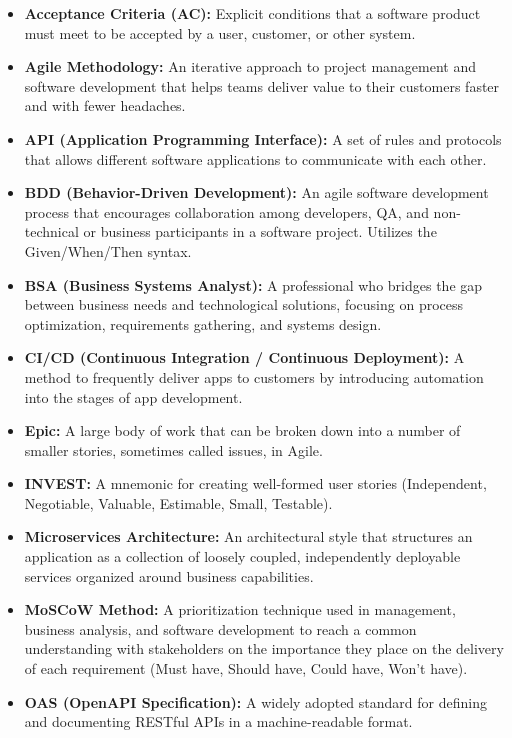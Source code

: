 \documentclass[
  11pt,
  openany,
  oneside]{book}
\providecommand{\tightlist}{%
  \setlength{\itemsep}{0pt}\setlength{\parskip}{0pt}}
\begin{document}
\begin{itemize}
\tightlist
\item
  \textbf{Acceptance Criteria (AC):} Explicit conditions that a software
  product must meet to be accepted by a user, customer, or other system.
\item
  \textbf{Agile Methodology:} An iterative approach to project
  management and software development that helps teams deliver value to
  their customers faster and with fewer headaches.
\item
  \textbf{API (Application Programming Interface):} A set of rules and
  protocols that allows different software applications to communicate
  with each other.
\item
  \textbf{BDD (Behavior-Driven Development):} An agile software
  development process that encourages collaboration among developers,
  QA, and non-technical or business participants in a software project.
  Utilizes the Given/When/Then syntax.
\item
  \textbf{BSA (Business Systems Analyst):} A professional who bridges
  the gap between business needs and technological solutions, focusing
  on process optimization, requirements gathering, and systems design.
\item
  \textbf{CI/CD (Continuous Integration / Continuous Deployment):} A
  method to frequently deliver apps to customers by introducing
  automation into the stages of app development.
\item
  \textbf{Epic:} A large body of work that can be broken down into a
  number of smaller stories, sometimes called issues, in Agile.
\item
  \textbf{INVEST:} A mnemonic for creating well-formed user stories
  (Independent, Negotiable, Valuable, Estimable, Small, Testable).
\item
  \textbf{Microservices Architecture:} An architectural style that
  structures an application as a collection of loosely coupled,
  independently deployable services organized around business
  capabilities.
\item
  \textbf{MoSCoW Method:} A prioritization technique used in management,
  business analysis, and software development to reach a common
  understanding with stakeholders on the importance they place on the
  delivery of each requirement (Must have, Should have, Could have,
  Won't have).
\item
  \textbf{OAS (OpenAPI Specification):} A widely adopted standard for
  defining and documenting RESTful APIs in a machine-readable format.

\end{itemize}
\end{document}
